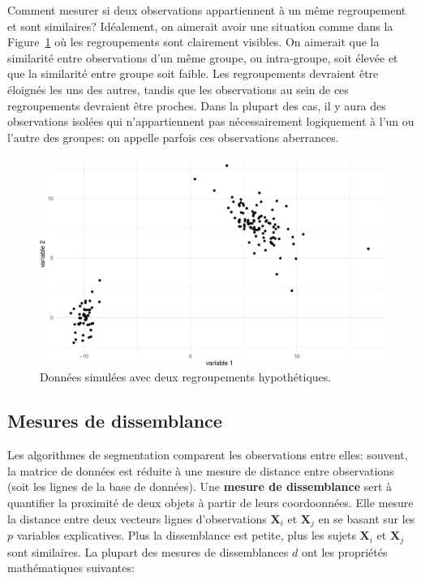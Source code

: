 \documentclass[
  11pt,
  letterpaper,
]{book}
\theoremstyle{definition}
\theoremstyle{remark}
\begin{document}
Comment mesurer si deux observations appartiennent à un même
regroupement et sont similaires? Idéalement, on aimerait avoir une
situation comme dans la Figure~\ref{fig-regroupements-bidons} où les
regroupements sont clairement visibles. On aimerait que la similarité
entre observations d'un même groupe, ou intra-groupe, soit élevée et que
la similarité entre groupe soit faible. Les regroupements devraient être
éloignés les uns des autres, tandis que les observations au sein de ces
regroupements devraient être proches. Dans la plupart des cas, il y aura
des observations isolées qui n'appartiennent pas nécessairement
logiquement à l'un ou l'autre des groupes: on appelle parfois ces
observations aberrances.

\begin{figure}[ht!]

{\centering \includegraphics[width=1\textwidth,height=\textheight]{./03-regroupements_files/figure-pdf/fig-regroupements-bidons-1.pdf}

}

\caption{\label{fig-regroupements-bidons}Données simulées avec deux
regroupements hypothétiques.}

\end{figure}

\hypertarget{mesures-de-dissemblance-1}{%
\subsection{Mesures de dissemblance}\label{mesures-de-dissemblance-1}}

Les algorithmes de segmentation comparent les observations entre elles:
souvent, la matrice de données est réduite à une mesure de distance
entre observations (soit les lignes de la base de données). Une
\textbf{mesure de dissemblance} sert à quantifier la proximité de deux
objets à partir de leurs coordoonnées. Elle mesure la distance entre
deux vecteurs lignes d'observations \(\mathbf{X}_i\) et \(\mathbf{X}_j\)
en se basant sur les \(p\) variables explicatives. Plus la dissemblance
est petite, plus les sujets \(\mathbf{X}_i\) et \(\mathbf{X}_j\) sont
similaires. La plupart des mesures de dissemblances \(d\) ont les
propriétés mathématiques suivantes:
\end{document}
